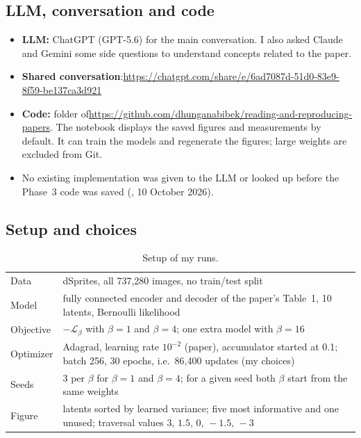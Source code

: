 \subsection{LLM, conversation and code}
\begin{itemize}
\item \textbf{LLM:} ChatGPT (GPT-5.6) for the main conversation. I also asked Claude and Gemini some side questions to understand concepts related to the paper.
\item \textbf{Shared conversation}:\newline \url{https://chatgpt.com/share/e/6ad7087d-51d0-83e9-8f59-be137ca3d921}
\item \textbf{Code:} folder  of\newline \url{https://github.com/dhunganabibek/reading-and-reproducing-papers}. The notebook  displays the saved figures and measurements by default. It can train the models and regenerate the figures; large weights are excluded from Git.
\item No existing implementation was given to the LLM or looked up before the Phase~3 code was saved (, 10 October 2026).
\end{itemize}

\subsection{Setup and choices}
\begin{table}[H]\centering\small
\begin{tabular}{@{}l@{\quad}p{}@{}}
\toprule
Data & dSprites, all 737{,}280 images, no train/test split\\
Model & fully connected encoder and decoder of the paper's Table~1, 10 latents, Bernoulli likelihood\\
Objective & $-\mathcal L_\beta$ with $\beta=1$ and $\beta=4$; one extra model with $\beta=16$\\
Optimizer & Adagrad, learning rate $10^{-2}$ (paper), accumulator started at 0.1; batch 256, 30 epochs, i.e.\ 86{,}400 updates (my choices)\\
Seeds & 3 per $\beta$ for $\beta=1$ and $\beta=4$; for a given seed both $\beta$ start from the same weights\\
Figure & latents sorted by learned variance; five most informative and one unused; traversal values $3,\,1.5,\,0,\,-1.5,\,-3$\\
\bottomrule
\end{tabular}
\caption{Setup of my runs.}
\end{table}

